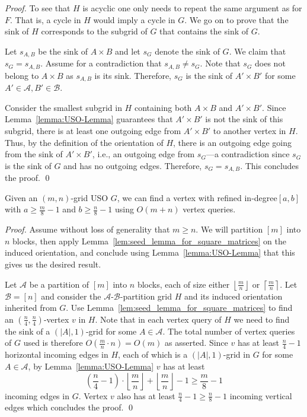 \documentclass[runningheads,a4paper]{llncs}
\newcommand{\indegree}{refined in-degree\xspace}
\newcommand{\A}{\ensuremath{\mathcal A}}
\newcommand{\B}{\ensuremath{\mathcal B}}
\newcommand{\s}[1]{\ensuremath{s_{\scriptscriptstyle#1}}}
\begin{document}
\begin{proof}
To see that $H$ is acyclic one only needs to repeat the same argument as for $F$. That is, a cycle in $H$ would imply a cycle in $G$. 
We go on to prove that the sink of $H$ corresponds to the subgrid of $G$ that contains the sink of $G$.

Let $\s{A,B}$ be the sink of $A\times B$ and let $\s{G}$ denote the sink of $G$.
We claim that $\s{G} = \s{A,B}$.
Assume for a contradiction that $\s{A,B}\neq \s{G}$.
Note that $\s{G}$ does not belong to $A\times B$ as $\s{A,B}$ is its sink.
Therefore, $\s{G}$ is the sink of $A'\times B'$ for some $A'\in \A, B'\in \B$.

Consider the smallest subgrid in $H$ containing both $A\times B$ and $A'\times B'$. 
Since Lemma~\ref{lemma:USO-Lemma} guarantees that $A'\times B'$ is not the sink of this subgrid, there is at least one outgoing edge from $A'\times B'$ to another vertex in $H$.
Thus, by the definition of the orientation of $H$, there is an outgoing edge going from the sink of $A'\times B'$, i.e., an outgoing edge from $\s{G}$---a contradiction since $\s{G}$ is the sink of $G$ and has no outgoing edges. 
Therefore, $\s{G} = \s{A,B}$. 
This concludes the proof. \qed



\end{proof}

\setcounter{corollary}{0}
\begin{corollary}
  Given an $(m,n)$-grid USO $G$, we can find a vertex with \indegree $[a,b]$ with $a \geq \frac{m}{8} - 1$ and  $b \geq \frac{n}{8} - 1$ using $O(m+n)$ vertex queries.
\end{corollary} 
\begin{proof}
 Assume without loss of generality that $m \geq n$. 
 We will partition $[m]$ into $n$ blocks, then apply Lemma~\ref{lem:seed_lemma_for_square_matrices} on the induced orientation, and conclude using
 Lemma~\ref{lemma:USO-Lemma} that this  gives us the desired result.
 
  Let $\A$ be a partition of $[m]$ into $n$ blocks, each of size either $\left\lfloor \frac{m}{n} \right\rfloor$ or $\left\lceil \frac{m}{n} \right\rceil$. Let $\B = [n]$ and 
consider the $\A$-$\B$-partition grid $H$ and its induced orientation inherited from $G$. 
 Use Lemma~\ref{lem:seed_lemma_for_square_matrices} to find an $(\frac{n}{4}, \frac{n}{4})$-vertex $v$ in $H$. 
 Note that in each vertex query of $H$ we need to find the sink of a $(|A|,1)$-grid for some $A\in \A$. 
 The total number of vertex queries of $G$ used is therefore $O(\frac{m}{n}\cdot n) = O(m)$ as asserted. 
 Since $v$ has at least $\frac{n}{4} - 1$ horizontal incoming edges in $H$, each of which is a $(|A|,1)$-grid in $G$ for some $A\in \A$, 
 by Lemma~\ref{lemma:USO-Lemma} $v$ has at least $$\left(\frac{n}{4} - 1\right)\cdot\left\lfloor \frac{m}{n} \right\rfloor + \left\lfloor \frac{m}{n} \right\rfloor - 1 \geq \frac{m}{8} - 1$$ incoming edges in $G$.
 Vertex $v$ also has at least $\frac{n}{4} - 1 \geq \frac{n}{8} - 1$ incoming vertical edges which concludes the proof. \qed
\end{proof}
\end{document}
